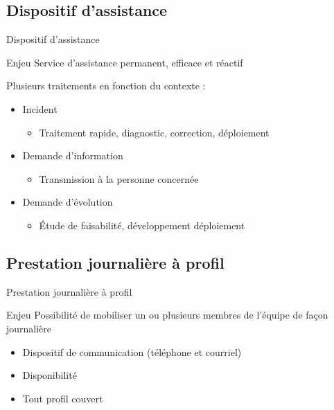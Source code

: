 \subsection{Dispositif d'assistance}
\begin{frame}{Dispositif d'assistance}
	\begin{block}{Enjeu}
	Service d'assistance permanent, efficace et réactif
	\end{block}
	\pause
	\vfill
	Plusieurs traitements en fonction du contexte : 
	\begin{itemize}
		\item Incident
			\begin{itemize}
				\item Traitement rapide, diagnostic, correction, déploiement
			\end{itemize}
		\item Demande d'information
			\begin{itemize}
				\item Transmission à la personne concernée
			\end{itemize}
		\item Demande d'évolution
		\begin{itemize}
			\item Étude de faisabilité, développement déploiement
		\end{itemize}
	\end{itemize}
\end{frame}
\DylanSpeak
\subsection{Prestation journalière à profil}
\begin{frame}{Prestation journalière à profil}
		\begin{block}{Enjeu}
			Possibilité de mobiliser un ou plusieurs membres de l'équipe de façon journalière
		\end{block}
		\begin{itemize}
			\item Dispositif de communication (téléphone et courriel)
			\item Disponibilité 
			\item Tout profil couvert
		\end{itemize}
\end{frame}
\DylanSpeak
